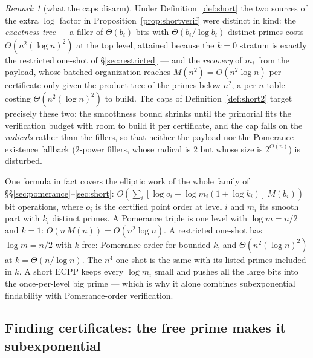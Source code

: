 \documentclass[11pt]{amsart}
\theoremstyle{plain}
\theoremstyle{definition}
\theoremstyle{remark}
\newtheorem{remark}[theorem]{Remark}
\begin{document}
\begin{remark}[what the caps disarm]\label{rem:tightshort}
Under Definition~\ref{def:short} the two sources of the extra $\log$ factor in
Proposition~\ref{prop:shortverif} were distinct in kind: the \emph{exactness tree} --- a filler of
$\Theta(b_i)$ bits with $\Theta(b_i/\log b_i)$ distinct primes costs $\Theta(n^2(\log n)^2)$ at the
top level, attained because the $k = 0$ stratum is exactly the restricted one-shot of
\S\ref{sec:restricted} --- and the \emph{recovery} of $m_i$ from the payload, whose batched
organization reaches $M(n^2) = O(n^2\log n)$ per certificate only given the product tree of the
primes below $n^2$, a per-$n$ table costing $\Theta(n^2(\log n)^2)$ to build.  The caps of
Definition~\ref{def:short2} target precisely these two: the smoothness bound shrinks until the
primorial fits the verification budget with room to build it per certificate, and the cap falls on
the \emph{radicals} rather than the fillers, so that neither the payload nor the Pomerance
existence fallback ($2$-power fillers, whose radical is $2$ but whose size is $2^{\Theta(n)}$) is
disturbed.
\end{remark}

One formula in fact covers the elliptic work of the whole family of
\S\S\ref{sec:pomerance}--\ref{sec:short}:
$O(\sum_i [\log o_i + \log m_i(1+\log k_i)]\,M(b_i))$ bit operations, where $o_i$ is the certified
point order at level $i$ and $m_i$ its smooth part with $k_i$ distinct primes.  A Pomerance triple is
one level with $\log m = n/2$ and $k = 1$: $O(n\,M(n)) = O(n^2\log n)$.  A restricted one-shot has
$\log m = n/2$ with $k$ free: Pomerance-order for bounded $k$, and $\Theta(n^2(\log n)^2)$ at
$k = \Theta(n/\log n)$.  The $n^4$ one-shot is the same with its listed primes included in $k$.  A
short ECPP keeps every $\log m_i$ small and pushes all the large bits into the once-per-level big
prime --- which is why it alone combines subexponential findability with Pomerance-order verification.

\subsection{Finding certificates: the free prime makes it subexponential}\label{sec:shortfind}
\end{document}
